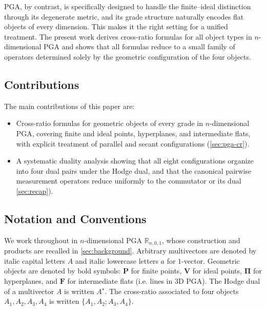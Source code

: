 \documentclass{birkjour}
\theoremstyle{definition}
\theoremstyle{remark}
\begin{document}
PGA, by contrast, is specifically designed to handle the
finite--ideal distinction through its degenerate metric, and its
grade structure naturally encodes flat objects of every dimension.
This makes it the right setting for a unified treatment. The present
work derives cross-ratio formulas for all object types in
$n$-dimensional PGA and shows that all formulas reduce to a small
family of operators determined solely by the geometric configuration
of the four objects.

\subsection{Contributions}
\label{sec:contributions}

The main contributions of this paper are:
\begin{itemize}
  \item Cross-ratio formulas for geometric objects of every grade in
    $n$-dimensional PGA, covering finite and ideal points,
    hyperplanes, and intermediate flats, with explicit treatment of
    parallel and secant configurations (\cref{sec:pga-cr}).
  \item A systematic duality analysis showing that all eight
    configurations organize into four dual pairs under the Hodge
    dual, and that the canonical pairwise measurement operators
    reduce uniformly to the commutator or its dual \cref{sec:recap}).
\end{itemize}

\subsection{Notation and Conventions}
\label{sec:notation}

We work throughout in $n$-dimensional PGA $\mathbb{R}_{n,0,1}$,
whose construction and products are recalled in
\cref{sec:background}. Arbitrary multivectors are denoted by
italic capital letters $A$ and italic lowercase letters $a$ for $1$-vector. Geometric objects are denoted by bold
symbols: $\mathbf{P}$ for finite points, $\mathbf{V}$
for ideal points, $\boldsymbol{\Pi}$ for hyperplanes, and $\mathbf{F}$ for intermediate flats (i.e. lines in 3D PGA).
The Hodge dual of a multivector $A$ is written
$A^\star$. The cross-ratio associated to four objects $A_1, A_2, A_3, A_4$ is written $\{A_1, A_2; A_3, A_4\}$.


\end{document}
